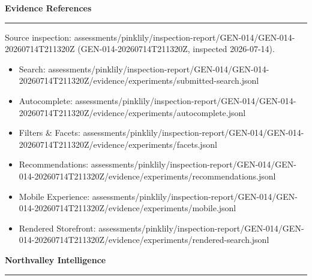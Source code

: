 \documentclass[10pt]{article}
\newcommand{\ReportSection}[1]{%
  \vspace{0.12in}
  {\fontsize{15}{18}\selectfont\bfseries\color{NVIInk}#1}\\[-0.02in]
  {\color{NVIAccent}\rule{\linewidth}{0.8pt}}
  \vspace{0.07in}
}
\newcommand{\ReportFine}[1]{{\fontsize{7.6}{9.1}\selectfont\color{NVIMuted}#1}}
\begin{document}
\vspace{0.14in}
\ReportSection{Evidence References}
\ReportFine{Source inspection: assessments/pinklily/inspection-report/GEN-014/GEN-014-20260714T211320Z (GEN-014-20260714T211320Z, inspected 2026-07-14).}\par
\begin{itemize}
\item \ReportFine{Search: assessments/pinklily/inspection-report/GEN-014/GEN-014-20260714T211320Z/evidence/experiments/submitted-search.jsonl}
\item \ReportFine{Autocomplete: assessments/pinklily/inspection-report/GEN-014/GEN-014-20260714T211320Z/evidence/experiments/autocomplete.jsonl}
\item \ReportFine{Filters \& Facets: assessments/pinklily/inspection-report/GEN-014/GEN-014-20260714T211320Z/evidence/experiments/facets.jsonl}
\item \ReportFine{Recommendations: assessments/pinklily/inspection-report/GEN-014/GEN-014-20260714T211320Z/evidence/experiments/recommendations.jsonl}
\item \ReportFine{Mobile Experience: assessments/pinklily/inspection-report/GEN-014/GEN-014-20260714T211320Z/evidence/experiments/mobile.jsonl}
\item \ReportFine{Rendered Storefront: assessments/pinklily/inspection-report/GEN-014/GEN-014-20260714T211320Z/evidence/experiments/rendered-search.jsonl}
\end{itemize}
\vfill
\begin{center}
{\fontsize{16}{19}\selectfont\bfseries\color{NVIInk}Northvalley Intelligence}\\[0.06in]
{\color{NVIAccent}\rule{2.2in}{0.8pt}}\\[0.08in]
\ReportFine{\NorthvalleyContactLine}
\end{center}
\end{document}

